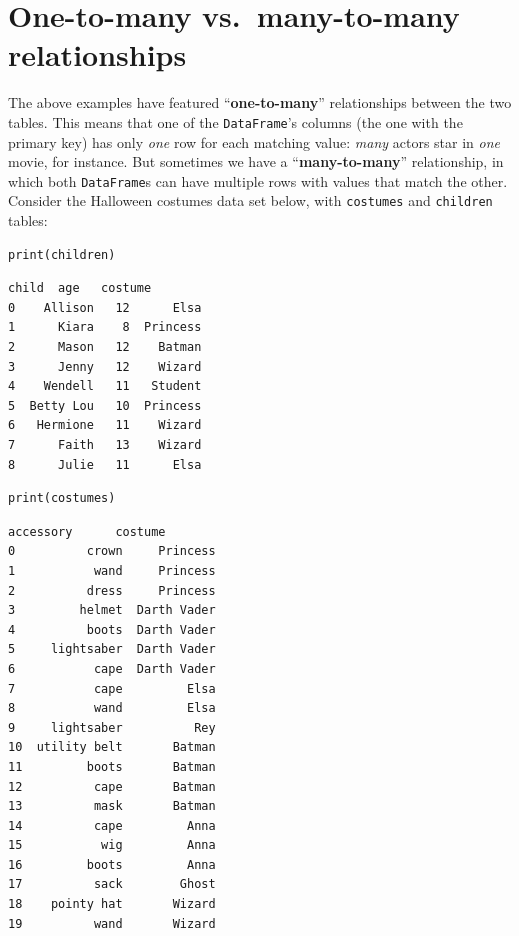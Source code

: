 \section[One-to-many vs.~many-to-many]{One-to-many vs.~many-to-many
relationships}


The above examples have featured ``\textbf{one-to-many}'' relationships between
the two tables. This means that one of the \texttt{DataFrame}'s columns (the
one with the primary key) has only \textit{one} row for each matching value:
\textit{many} actors star in \textit{one} movie, for instance. But sometimes we
have a ``\textbf{many-to-many}'' relationship, in which both
\texttt{DataFrame}s can have multiple rows with values that match the other.
Consider the Halloween costumes data set below, with \texttt{costumes} and
\texttt{children} tables:

\begin{Verbatim}[fontsize=\footnotesize,samepage=true,frame=single,framesep=3mm]
print(children)
\end{Verbatim}
\vspace{-.2in}

\begin{Verbatim}[fontsize=\small,samepage=true,frame=leftline,framesep=5mm,framerule=1mm]
       child  age   costume
0    Allison   12      Elsa
1      Kiara    8  Princess
2      Mason   12    Batman
3      Jenny   12    Wizard
4    Wendell   11   Student
5  Betty Lou   10  Princess
6   Hermione   11    Wizard
7      Faith   13    Wizard
8      Julie   11      Elsa
\end{Verbatim}

\pagebreak
\begin{Verbatim}[fontsize=\footnotesize,samepage=true,frame=single,framesep=3mm]
print(costumes)
\end{Verbatim}
\vspace{-.5in}

\begin{Verbatim}[fontsize=\small,samepage=true,frame=leftline,framesep=5mm,framerule=1mm]
       accessory      costume
0          crown     Princess
1           wand     Princess
2          dress     Princess
3         helmet  Darth Vader
4          boots  Darth Vader
5     lightsaber  Darth Vader
6           cape  Darth Vader
7           cape         Elsa
8           wand         Elsa
9     lightsaber          Rey
10  utility belt       Batman
11         boots       Batman
12          cape       Batman
13          mask       Batman
14          cape         Anna
15           wig         Anna
16         boots         Anna
17          sack        Ghost
18    pointy hat       Wizard
19          wand       Wizard
\end{Verbatim}


